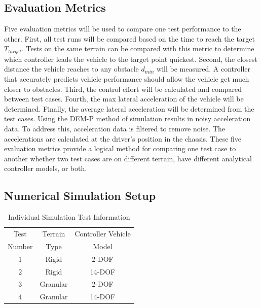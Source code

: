 \documentclass[12pt,twocolumn]{article}
\begin{document}

\subsection{Evaluation Metrics}\label{ss:Metrics}
Five evaluation metrics will be used to compare one test performance to the other. First, all test runs will be compared based on the time to reach the target $T_{target}$. Tests on the same terrain can be compared with this metric to determine which controller leads the vehicle to the target point quickest. Second, the closest distance the vehicle reaches to any obstacle $d_{min}$ will be measured. A controller that accurately predicts vehicle performance should allow the vehicle get much closer to obstacles. Third, the control effort will be calculated and compared between test cases. Fourth, the max lateral acceleration of the vehicle will be determined. Finally, the average lateral acceleration will be determined from the test cases. Using the DEM-P method of simulation results in noisy acceleration data. To address this, acceleration data is filtered to remove noise. The accelerations are calculated at the driver's position in the chassis. These five evaluation metrics provide a logical method for comparing one test case to another whether two test cases are on different terrain, have different analytical controller models, or both. 


\subsection{Numerical Simulation Setup }\label{ss:Setup}

\begin{table}
\begin{center}
	\begin{tabular}{||c |c | c||} 
		\hline
		Test  & Terrain  & Controller Vehicle \\
		Number &  Type & Model\\ [0.5ex] 	
		\hline\hline
		1 & Rigid & 2-DOF \\ 
		\hline
		2 & Rigid & 14-DOF \\
		\hline
		3 & Granular & 2-DOF \\
		\hline
		4 & Granular & 14-DOF \\
		\hline
	\end{tabular}
\end{center}
\caption{Individual Simulation Test Information}
\label{t:TestMatrix}
\end{table}
\end{document}
